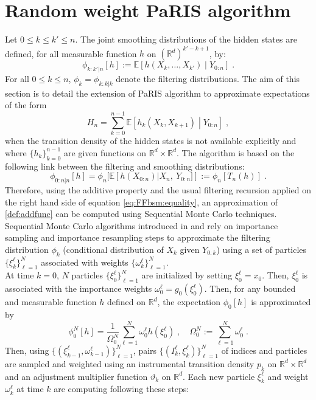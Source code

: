 \documentclass[12pt]{article}
\newcommand{\eqsp}{\;}
\newcommand{\1}{\mathrm{1}}
\newcommand{\E}{\mathbb{E}}
\begin{document}
\section{Random weight PaRIS algorithm}
Let $0 \leq k \leq k' \leq n$. The joint smoothing distributions of the hidden states are defined, for all measurable function $h$ on $(\mathbb{R}^d)^{k'-k + 1}$, by:
\[
\phi_{k:k'|n}[h] := \mathbb{E}\left[h(X_k,\ldots,X_{k'})\middle|Y_{0:n}\right]\eqsp.
\]
For all $0\le k\le n$, $\phi_{k} = \phi_{k:k|k}$ denote the filtering distributions. The aim of this section is to detail the extension of PaRIS algorithm to approximate expectations of the form
\begin{equation}
\label{def:addfunc}
H_{n} =  \sum_{k=0}^{n-1}\mathbb{E}\left[h_k(X_{k},X_{k+1})\middle|Y_{0:n}\right]\eqsp,
\end{equation}
when the transition density of the hidden states is not available explicitly and where $\{h_k\}_{k=0}^{n-1}$ are given functions on $\mathbb{R}^d\times \mathbb{R}^d$. The algorithm is based on the following link between the filtering and smoothing distributions:
\begin{equation}
\phi_{0:n|n}[h] = \phi_n[\E\left[h(X_{0:n})\vert X_n,~Y_{0:n}]\right]:= \phi_n[T_n(h)] \eqsp.\label{eq:FFbsm:equality}
\end{equation}
Therefore, using the additive property and the usual filtering recursion applied on the right hand side of equation \eqref{eq:FFbsm:equality}, an approximation of \eqref{def:addfunc} can be computed using Sequential Monte Carlo techniques.\\ 
Sequential Monte Carlo algorithms introduced in  \cite{gordon:salmond:smith:1993} and \cite{kitagawa:1996} rely on importance sampling and importance resampling steps to approximate the filtering distribution $\phi_{k}$ (conditional distribution of $X_k$ given $Y_{0:k}$) using  a set of particles $\{\xi^{\ell}_k\}_{\ell=1}^N$ associated with weights $\{\omega^{\ell}_k\}_{\ell=1}^N$.\\
At time $k = 0$, $N$ particles $\{\xi^{\ell}_0\}_{\ell=1}^N$ are initialized by setting $\xi^{\ell}_0=x_0$. Then, $\xi^{\ell}_0$ is associated with the importance weights $\omega_0^{\ell} = g_0 \left(\xi^{\ell}_0\right)$. 
Then, for any bounded and measurable function $h$ defined on $\mathbb{R}^d$, the expectation $\phi_{0}[h] $ is approximated by
\[
\phi^N_{0}[h] = \frac{1}{\Omega_0^N} \sum_{\ell=1}^N \omega_0^{\ell} h \left(\xi^{\ell}_0 \right)\eqsp, \quad \Omega_0^N:= \sum_{\ell=1}^N \omega_0^{\ell}\eqsp.
\]
Then, using $\{(\xi^{\ell}_{k-1},\omega^{\ell}_{k-1})\}_{\ell=1}^N$, pairs $\{(I^{\ell}_k,\xi^{\ell}_{k})\}_{\ell=1}^N$ of indices and particles are sampled and weighted using an instrumental transition density $p_k$ on $\mathbb{R}^d\times \mathbb{R}^d$ and an adjustment multiplier function $\vartheta_k$ on $\mathbb{R}^d$. Each new particle $\xi^{\ell}_{k}$ and weight $\omega^{\ell}_k$ at time $k$ are computing following these steps:
\end{document}
